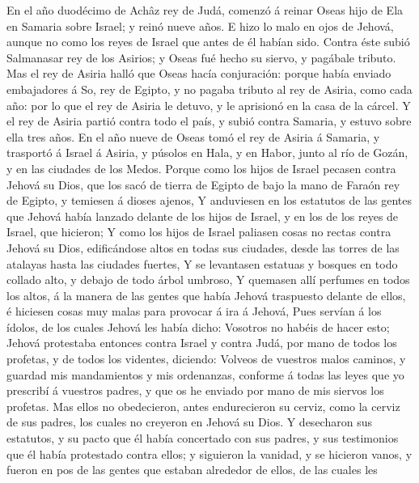  En el año duodécimo de Achâz rey de Judá, comenzó á
reinar Oseas hijo de Ela en Samaria sobre Israel; y reinó nueve años.
 E hizo lo malo en ojos de Jehová, aunque no como los
reyes de Israel que antes de él habían sido.  Contra éste
subió Salmanasar rey de los Asirios; y Oseas fué hecho su siervo, y
pagábale tributo.  Mas el rey de Asiria halló que Oseas
hacía conjuración: porque había enviado embajadores á So, rey de Egipto,
y no pagaba tributo al rey de Asiria, como cada año: por lo que el rey
de Asiria le detuvo, y le aprisionó en la casa de la cárcel.
 Y el rey de Asiria partió contra todo el país, y subió
contra Samaria, y estuvo sobre ella tres años.  En el año
nueve de Oseas tomó el rey de Asiria á Samaria, y trasportó á Israel á
Asiria, y púsolos en Hala, y en Habor, junto al río de Gozán, y en las
ciudades de los Medos.  Porque como los hijos de Israel
pecasen contra Jehová su Dios, que los sacó de tierra de Egipto de bajo
la mano de Faraón rey de Egipto, y temiesen á dioses ajenos,
 Y anduviesen en los estatutos de las gentes que Jehová
había lanzado delante de los hijos de Israel, y en los de los reyes de
Israel, que hicieron;  Y como los hijos de Israel paliasen
cosas no rectas contra Jehová su Dios, edificándose altos en todas sus
ciudades, desde las torres de las atalayas hasta las ciudades fuertes,
 Y se levantasen estatuas y bosques en todo collado alto,
y debajo de todo árbol umbroso,  Y quemasen allí perfumes
en todos los altos, á la manera de las gentes que había Jehová
traspuesto delante de ellos, é hiciesen cosas muy malas para provocar á
ira á Jehová,  Pues servían á los ídolos, de los cuales
Jehová les había dicho: Vosotros no habéis de hacer esto;
 Jehová protestaba entonces contra Israel y contra Judá,
por mano de todos los profetas, y de todos los videntes, diciendo:
Volveos de vuestros malos caminos, y guardad mis mandamientos y mis
ordenanzas, conforme á todas las leyes que yo prescribí á vuestros
padres, y que os he enviado por mano de mis siervos los profetas.
 Mas ellos no obedecieron, antes endurecieron su cerviz,
como la cerviz de sus padres, los cuales no creyeron en Jehová su Dios.
 Y desecharon sus estatutos, y su pacto que él había
concertado con sus padres, y sus testimonios que él había protestado
contra ellos; y siguieron la vanidad, y se hicieron vanos, y fueron en
pos de las gentes que estaban alrededor de ellos, de las cuales les
